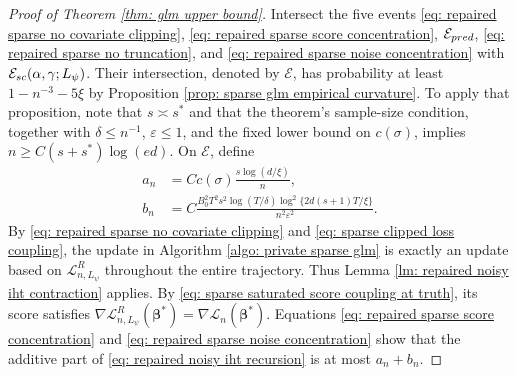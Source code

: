 \documentclass[letterpaper,12pt]{article}
\numberwithin{equation}{section}
\theoremstyle{plain}
\numberwithin{Theorem}{section}
\numberwithin{proposition}{section}
\numberwithin{Lemma}{section}
{
	\theoremstyle{definition}
	\newtheorem{Definition}{Definition}
	\newtheorem{example}{Example}
	\numberwithin{example}{section}
	\newtheorem{fact}{Fact}
	\numberwithin{fact}{section}
	\newtheorem{remark}{Remark}
}
\newcommand{\1}{\mathbbm{1}}
\def\bbeta{{\boldsymbol{\beta}}}
\def\L{{\mathcal L}}
\begin{document}
\begin{proof}[Proof of Theorem \ref{thm: glm upper bound}]
	Intersect the five events
	\eqref{eq: repaired sparse no covariate clipping},
	\eqref{eq: repaired sparse score concentration},
	$\mathcal E_{\rm pred}$,
	\eqref{eq: repaired sparse no truncation}, and
	\eqref{eq: repaired sparse noise concentration} with
	$\mathcal E_{\rm sc}(\alpha,\gamma;L_\psi)$. Their intersection, denoted by
	$\mathcal E$, has probability at least $1-n^{-3}-5\xi$ by
	Proposition \ref{prop: sparse glm empirical curvature}.  To apply that
	proposition, note that $s\asymp s^*$ and that the theorem's sample-size
	condition, together with $\delta\leq n^{-1}$, $\varepsilon\leq1$, and
	the fixed lower bound on $c(\sigma)$, implies
	$n\geq C(s+s^*)\log(ed)$.  On
	$\mathcal E$, define
\begin{align*}
a_n&=Cc(\sigma)\frac{s\log(d/\xi)}n,\\
b_n&=C\frac{B_0^2T^2s^2\log(T/\delta)
\log^2\{2d(s+1)T/\xi\}}{n^2\varepsilon^2}.
\end{align*}
By \eqref{eq: repaired sparse no covariate clipping} and
\eqref{eq: sparse clipped loss coupling}, the update in Algorithm
\ref{algo: private sparse glm} is exactly an update based on
\(\L_{n,L_\psi}^R\) throughout the entire trajectory. Thus Lemma
\ref{lm: repaired noisy iht contraction} applies.  By
\eqref{eq: sparse saturated score coupling at truth}, its score
satisfies
\(\nabla\L_{n,L_\psi}^R(\bbeta^*)=\nabla\L_n(\bbeta^*)\).
Equations \eqref{eq: repaired sparse score concentration} and
\eqref{eq: repaired sparse noise concentration} show that the additive
part of \eqref{eq: repaired noisy iht recursion} is at most
$a_n+b_n$.


\end{proof}
\end{document}
